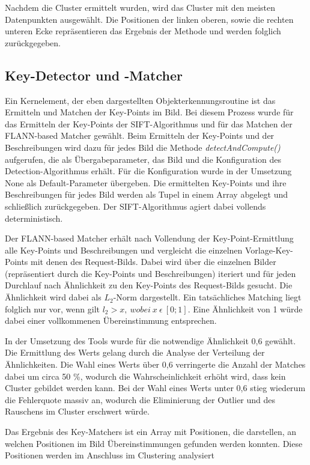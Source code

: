 \documentclass[
    type=Projektarbeit,
    status=draft, %
    language=german, %
    bibengine=bibtex,
]{unibwm-inf-thesis}
\begin{document}
    Nachdem die Cluster ermittelt wurden, wird das Cluster mit den meisten Datenpunkten ausgewählt.
    Die Positionen der linken oberen, sowie die rechten unteren Ecke repräsentieren das Ergebnis der Methode und werden folglich zurückgegeben.


    \subsection{Key-Detector und -Matcher} \label{subsubsec:Key-Detector-Matcher}
    Ein Kernelement, der eben dargestellten Objekterkennungsroutine ist das Ermitteln und Matchen der Key-Points im Bild.
    Bei diesem Prozess wurde für das Ermitteln der Key-Points der SIFT-Algorithmus und für das Matchen der FLANN-based Matcher gewählt.
    Beim Ermitteln der Key-Points und der Beschreibungen wird dazu für jedes Bild die Methode \textit{detectAndCompute()} aufgerufen, die als Übergabeparameter, das Bild und die Konfiguration des Detection-Algorithmus erhält.
    Für die Konfiguration wurde in der Umsetzung None als Default-Parameter übergeben.
    Die ermittelten Key-Points und ihre Beschreibungen für jedes Bild werden als Tupel in einem Array abgelegt und schließlich zurückgegeben.
    Der SIFT-Algorithmus agiert dabei vollends deterministisch.

    Der FLANN-based Matcher erhält nach Vollendung der Key-Point-Ermittlung alle Key-Points und Beschreibungen und vergleicht die einzelnen Vorlage-Key-Points mit denen des Request-Bilds.
    Dabei wird über die einzelnen Bilder (repräsentiert durch die Key-Points und Beschreibungen) iteriert und für jeden Durchlauf nach Ähnlichkeit zu den Key-Points des Request-Bilds gesucht.
    Die Ähnlichkeit wird dabei als $L_{2}$-Norm dargestellt.
    Ein tatsächliches Matching liegt folglich nur vor, wenn gilt $l_{2} > x,~wobei~x~\epsilon~[0; 1]$.
    Eine Ähnlichkeit von 1 würde dabei einer vollkommenen Übereinstimmung entsprechen.

    In der Umsetzung des Tools wurde für die notwendige Ähnlichkeit 0,6 gewählt.
    Die Ermittlung des Werts gelang durch die Analyse der Verteilung der Ähnlichkeiten.
    Die Wahl eines Werts über 0,6 verringerte die Anzahl der Matches dabei um circa 50 \%, wodurch die Wahrscheinlichkeit erhöht wird, dass kein Cluster gebildet werden kann.
    Bei der Wahl eines Werts unter 0,6 stieg wiederum die Fehlerquote massiv an, wodurch die Eliminierung der Outlier und des Rauschens im Cluster erschwert würde.

    Das Ergebnis des Key-Matchers ist ein Array mit Positionen, die darstellen, an welchen Positionen im Bild Übereinstimmungen gefunden werden konnten.
    Diese Positionen werden im Anschluss im Clustering analysiert
\end{document}
